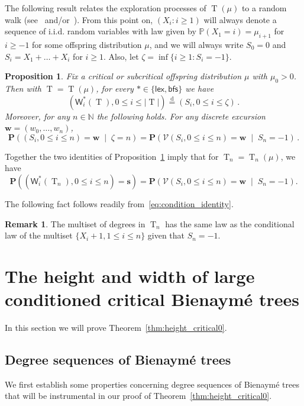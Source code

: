 \documentclass[10pt]{amsart}
\newtheorem{prop}[theo]{Proposition}
\theoremstyle{definition}
\newtheorem{rema}[theo]{Remark}
\numberwithin{figure}{section}
\newcommand{\N}{\mathbb{N}}
\renewcommand{\P}{\mathbb{P}}
\newcommand*\W{\mathsf{W}}
\newcommand{\bfs}{\mathsf{bfs}}
\newcommand{\p}{\mathbf{P}}
\newcommand{\bfw}{\mathbf{w}}
\newcommand{\bffs}{\mathbf{s}}
\newcommand{\lex}{\mathsf{lex}}
\DeclareMathOperator{\rtree}{T}
\newcommand{\cV}{\mathcal{V}}
\newcommand{\set}[1]{\left(#1 \right)}
\newcommand{\Cprob}[2]{\mathbf{P}\set{\left. #1 \; \middle| \; #2\right.}}
\newcommand{\eqdist}{\ensuremath{\stackrel{\mathrm{d}}{=}}}
\begin{document}
The following result relates the exploration processes of $\rtree(\mu)$ to a random walk (see~\cite[Proposition~1.5]{LG05} and/or~\cite[Chapter~5 Exercise~1]{MR2245368}). From this point on, $(X_{i} : i \geq 1)$ will always denote a sequence of i.i.d. random variables with law given by $\P(X_{1}=i)=\mu_{i+1}$ for $i \geq -1$ for some offspring distribution $\mu$, and we will always write $S_0=0$ and $S_i=X_1+\ldots+X_i$ for $i \ge 1$. Also, let $\zeta=\inf\{i \ge 1: S_i = -1\}$.
\begin{prop}\label{prop:GWRW}
Fix a critical or subcritical offspring distribution $\mu$ with $\mu_0>0$. Then with $\rtree=\rtree(\mu)$, for every $\ast \in \{\lex,\bfs\}$ we have
\[
\left(\W^{\ast}_{i}(\rtree),0 \le i \le |\rtree|\right)\eqdist (S_i,0 \le i \le \zeta)\,.
\]
Moreover, for any $n \in \N$ the following holds. For any discrete excursion $\bfw=(w_0,\ldots,w_n)$,
\[
\Cprob{(S_i,0 \le i \le n)=\bfw}{\zeta=n} =\Cprob{\cV(S_i,0 \le i \le n)=\bfw}{S_n=-1}\,.
\]
\end{prop}

Together the two identities of Proposition~\ref{prop:GWRW} imply that for $\rtree_n=\rtree_n(\mu)$, we have
\begin{equation}\label{eq:condition_identity}
\p\left((\W^{\ast}_{i}(\rtree_n),0 \le i \le n)=\bffs\right) =
\Cprob{\cV(S_i,0 \le i \le n)=\bfw}{S_n=-1}.
\end{equation}

The following fact follows readily from~\eqref{eq:condition_identity}.
\begin{rema}\label{rk:degrees}
The multiset of degrees in $\rtree_n$ has the same law as the conditional law of the multiset $\{X_i+1,1 \le i \le n\}$ given that $S_n=-1$.
\end{rema}



\setcounter{section}{3}
\section{The height {and width} of large conditioned critical Bienaymé trees}\label{sec:height_critical}
In this section we will prove Theorem~\ref{thm:height_critical0}.


\subsection{Degree sequences of Bienaymé trees}\label{ssec:deg_seq_bien}
We first establish some properties concerning degree sequences of Bienaymé trees {that will be instrumental in our proof of Theorem~\ref{thm:height_critical0}.}
\end{document}
